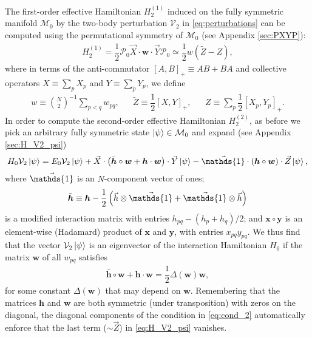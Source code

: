 \documentclass[nofootinbib,notitlepage,11pt]{revtex4-2}
\newcommand{\f}[2]{\dfrac{#1}{#2}} %
\newcommand{\p}[1]{\left(#1\right)} %
\renewcommand{\sp}[1]{\left[#1\right]} %
\renewcommand{\c}{\cdot} %
\renewcommand{\oc}{\circ} %
\newcommand{\m}{\bm} %
\renewcommand{\v}{\vec} %
\newcommand{\1}{\mathds{1}}
\newcommand{\M}{\mathcal{M}}
\renewcommand{\P}{\mathcal{P}}
\newcommand{\V}{\mathcal{V}}
\begin{document}
The first-order effective Hamiltonian $H_2^{(1)}$ induced on the fully
symmetric manifold $\M_0$ by the two-body perturbation $\V_2$ in
\eqref{eq:perturbations} can be computed using the permutational
symmetry of $\M_0$ (see Appendix \ref{sec:PXYP}):
\begin{align}
  H_2^{(1)}
  = \f12 \P_0 \v X\c\m w\c\v Y\P_0
  \simeq \f12 w \p{\tilde Z - Z},
\end{align}
where in terms of the anti-commutator $\sp{A,B}_+\equiv AB+BA$ and
collective operators $X\equiv\sum_p X_p$ and $Y\equiv\sum_p Y_p$, we
define
\begin{align}
  w \equiv {N\choose 2}^{-1} \sum_{p<q} w_{pq},
  &&
  \tilde Z \equiv \f12 \sp{X,Y}_+,
  &&
  Z \equiv \sum_p \f12 \sp{X_p, Y_p}_+.
\end{align}
In order to compute the second-order effective Hamiltonian
$H_2^{(2)}$, as before we pick an arbitrary fully symmetric state
$\ket\psi\in\M_0$ and expand (see Appendix \ref{sec:H_V2_psi})
\begin{align}
  H_0 \V_2 \ket\psi
  = E_0 \V_2 \ket\psi
  + \v X \c \p{\bar{\m h}\oc\m w + \m h\c\m w} \c \v Y \ket\psi
  - \v\1 \c \p{\m h\oc\m w} \c \v Z \ket\psi,
  \label{eq:H_V2_psi}
\end{align}
where $\v\1$ is an $N$-component vector of ones;
\begin{align}
  \bar{\m h}
  \equiv \m h - \f12\p{\v h\otimes\v\1 + \v\1\otimes\v h}
\end{align}
is a modified interaction matrix with entries $h_{pq}-\p{h_p+h_q}/2$;
and $\m x\oc\m y$ is an element-wise (Hadamard) product of $\m x$ and
$\m y$, with entries $x_{pq}y_{pq}$.  We thus find that the vector
$\V_2\ket\psi$ is an eigenvector of the interaction Hamiltonian $H_0$
if the matrix $\m w$ of all $w_{pq}$ satisfies
\begin{align}
  \bar{\m h}\oc\m w + \m h\c\m w = \f12 \Delta\p{\m w} \m w,
  \label{eq:cond_2}
\end{align}
for some constant $\Delta\p{\m w}$ that may depend on $\m w$.
Remembering that the matrices $\m h$ and $\m w$ are both symmetric
(under transposition) with zeros on the diagonal, the diagonal
components of the condition in \eqref{eq:cond_2} automatically enforce
that the last term ($\sim\v Z$) in \eqref{eq:H_V2_psi} vanishes.
\end{document}
